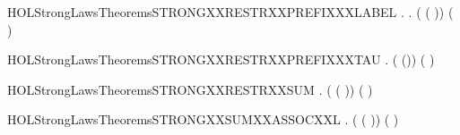 \begin{SaveVerbatim}{HOLStrongLawsTheoremsSTRONGXXRESTRXXPREFIXXXLABEL}
\HOLTokenTurnstile{} \HOLSymConst{\HOLTokenForall{}} .
        \HOLConst{\HOLTokenNotIn{}}  \HOLSymConst{\HOLTokenConj{}}   \HOLConst{\HOLTokenNotIn{}}  \HOLSymConst{\HOLTokenImp{}}
       \HOLSymConst{\HOLTokenForall{}}.  (\HOLConst{\ensuremath{\nu}}  ( )) ( \HOLConst{\ensuremath{\nu}}  )
\end{SaveVerbatim}
\newcommand{\HOLStrongLawsTheoremsSTRONGXXRESTRXXPREFIXXXLABEL}{\UseVerbatim{HOLStrongLawsTheoremsSTRONGXXRESTRXXPREFIXXXLABEL}}
\begin{SaveVerbatim}{HOLStrongLawsTheoremsSTRONGXXRESTRXXPREFIXXXTAU}
\HOLTokenTurnstile{} \HOLSymConst{\HOLTokenForall{}} .  (\HOLConst{\ensuremath{\nu}}  (\HOLConst{\ensuremath{\tau}})) (\HOLConst{\ensuremath{\tau}}\HOLConst{\ensuremath{\nu}}  )
\end{SaveVerbatim}
\newcommand{\HOLStrongLawsTheoremsSTRONGXXRESTRXXPREFIXXXTAU}{\UseVerbatim{HOLStrongLawsTheoremsSTRONGXXRESTRXXPREFIXXXTAU}}
\begin{SaveVerbatim}{HOLStrongLawsTheoremsSTRONGXXRESTRXXSUM}
\HOLTokenTurnstile{} \HOLSymConst{\HOLTokenForall{}}  .  (\HOLConst{\ensuremath{\nu}}  ( \HOLSymConst{+} )) (\HOLConst{\ensuremath{\nu}}   \HOLSymConst{+} \HOLConst{\ensuremath{\nu}}  )
\end{SaveVerbatim}
\newcommand{\HOLStrongLawsTheoremsSTRONGXXRESTRXXSUM}{\UseVerbatim{HOLStrongLawsTheoremsSTRONGXXRESTRXXSUM}}
\begin{SaveVerbatim}{HOLStrongLawsTheoremsSTRONGXXSUMXXASSOCXXL}
\HOLTokenTurnstile{} \HOLSymConst{\HOLTokenForall{}}  .  ( \HOLSymConst{+} ( \HOLSymConst{+} )) ( \HOLSymConst{+}  \HOLSymConst{+} )
\end{SaveVerbatim}
